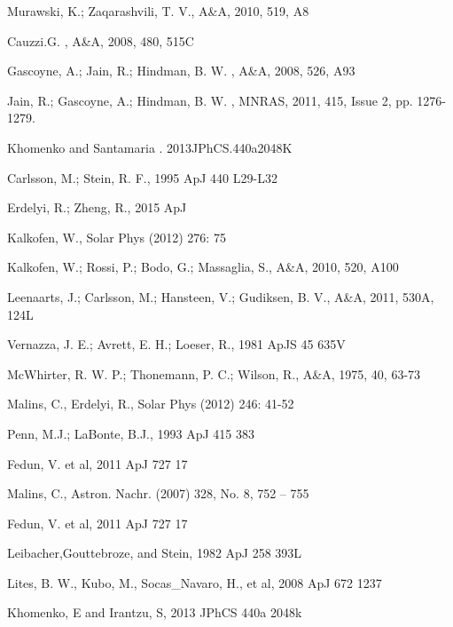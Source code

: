 \documentclass{aa}
\begin{document}
\begin{thebibliography}{}
  Murawski, K.; Zaqarashvili, T. V., A\&A, 2010, 519, A8

Cauzzi.G. , A\&A, 2008, 480, 515C

Gascoyne, A.; Jain, R.; Hindman, B. W. , A\&A, 2008, 526, A93

Jain, R.; Gascoyne, A.; Hindman, B. W. , MNRAS, 2011, 415, Issue 2, pp. 1276-1279.

Khomenko and Santamaria . 2013JPhCS.440a2048K

 Carlsson, M.; Stein, R. F., 1995 ApJ 440 L29-L32

 Erdelyi, R.; Zheng, R., 2015 ApJ

 Kalkofen, W., Solar Phys (2012) 276: 75

 Kalkofen, W.; Rossi, P.; Bodo, G.; Massaglia, S., A\&A, 2010, 520, A100

 Leenaarts, J.; Carlsson, M.; Hansteen, V.; Gudiksen, B. V., A\&A, 2011, 530A, 124L

 Vernazza, J. E.; Avrett, E. H.; Loeser, R., 1981 ApJS 45 635V

 McWhirter, R. W. P.; Thonemann, P. C.; Wilson, R., A\&A, 1975, 40, 63-73

 Malins, C., Erdelyi, R., Solar Phys (2012) 246: 41-52

 Penn, M.J.; LaBonte, B.J., 1993 ApJ 415 383

 Fedun, V. et al, 2011 ApJ 727 17

 Malins, C.,  Astron. Nachr. (2007) 328, No. 8, 752 – 755

 Fedun, V. et al, 2011 ApJ 727 17

Leibacher,Gouttebroze, and Stein, 1982 ApJ 258 393L

Lites, B. W., Kubo, M., Socas_Navaro, H., et al, 2008 ApJ 672 1237

Khomenko, E and Irantzu, S, 2013 JPhCS 440a 2048k


\end{thebibliography}
\end{document}
